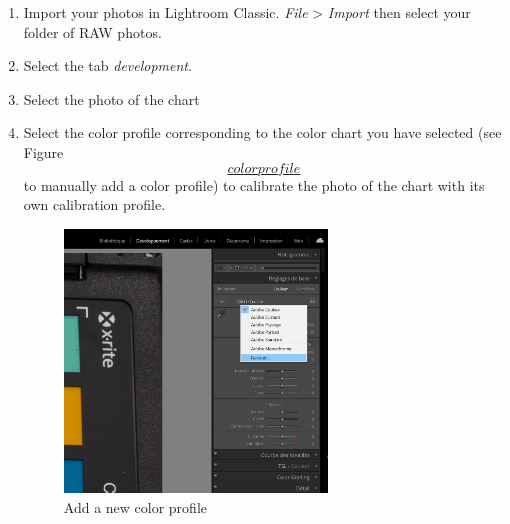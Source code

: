 \documentclass[
]{book}
\theoremstyle{definition}
\theoremstyle{definition}
\theoremstyle{definition}
\theoremstyle{definition}
\theoremstyle{remark}
\begin{document}
\begin{enumerate}
\def\labelenumi{\arabic{enumi}.}
\item
  Import your photos in Lightroom Classic. \emph{File} \textgreater{} \emph{Import} then
  select your folder of RAW photos.
\item
  Select the tab \emph{development}.
\item
  Select the photo of the chart
\item
  Select the color profile corresponding to the color chart you have
  selected (see Figure
  \protect\hyperlink{colorux5cux2520profile}{\[color profile\]} to manually add a color profile) to
  calibrate the photo of the chart with its own calibration profile.

  \begin{figure}
  \hypertarget{add_profile}{%
  \centering
  \includegraphics[width=\textwidth,height=7cm]{Figures/profil_capture_1.png}
  \caption{Add a new color
  profile}\label{add_profile}
  }
  \end{figure}


\end{enumerate}
\end{document}
